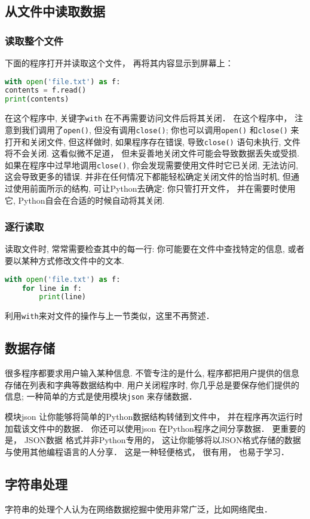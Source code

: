 \subsection{从文件中读取数据}
\subsubsection{读取整个文件}
下面的程序打开并读取这个文件， 再将其内容显示到屏幕上：
\begin{lstlisting}[language=python]
with open('file.txt') as f:
contents = f.read()
print(contents)
\end{lstlisting}
在这个程序中, 关键字\verb|with| 在不再需要访问文件后将其关闭． 在这个程序中， 注意到我们调用了\verb|open()|, 但没有调用\verb|close()|; 你也可以调用\verb|open()| 和\verb|close()| 来打开和关闭文件, 但这样做时, 如果程序存在错误, 导致\verb|close()| 语句未执行, 文件将不会关闭.  这看似微不足道， 但未妥善地关闭文件可能会导致数据丢失或受损.  如果在程序中过早地调用\verb|close()|, 你会发现需要使用文件时它已关闭, 无法访问, 这会导致更多的错误. 并非在任何情况下都能轻松确定关闭文件的恰当时机, 但通过使用前面所示的结构, 可让Python去确定: 你只管打开文件， 并在需要时使用它, Python自会在合适的时候自动将其关闭.

\subsubsection{逐行读取}
读取文件时, 常常需要检查其中的每一行: 你可能要在文件中查找特定的信息, 或者要以某种方式修改文件中的文本.
\begin{lstlisting}[language=python]
with open('file.txt') as f:
    for line in f:
        print(line)
\end{lstlisting}

利用\verb|with|来对文件的操作与上一节类似，这里不再赘述．

\subsection{数据存储}
很多程序都要求用户输入某种信息. 不管专注的是什么, 程序都把用户提供的信息存储在列表和字典等数据结构中.  用户关闭程序时, 你几乎总是要保存他们提供的信息; 一种简单的方式是使用模块\verb|json| 来存储数据．

模块json 让你能够将简单的Python数据结构转储到文件中， 并在程序再次运行时加载该文件中的数据． 你还可以使用json 在Python程序之间分享数据． 更重要的是， JSON数据
格式并非Python专用的， 这让你能够将以JSON格式存储的数据与使用其他编程语言的人分享． 这是一种轻便格式， 很有用， 也易于学习．

\subsection{字符串处理}
字符串的处理个人认为在网络数据挖掘中使用非常广泛，比如网络爬虫．